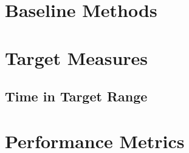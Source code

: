\section{Baseline Methods}\label{sec:baseline-methods}


\section{Target Measures}\label{sec:target-measures}

\subsection{Time in Target Range}




\section{Performance Metrics}\label{sec:performance-metric}




















